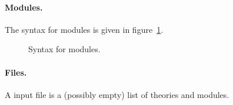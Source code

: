\paragraph{Modules.}
The syntax for modules is given in figure~\ref{fig:bnf:module}.
\begin{figure}
  \begin{center}\framebox{}\end{center}
  \caption{Syntax for modules.}
\label{fig:bnf:module}
\end{figure}

\paragraph{Files.}
A \whyml input file is a (possibly empty) list of theories and modules.
\begin{center}\framebox{}\end{center}


